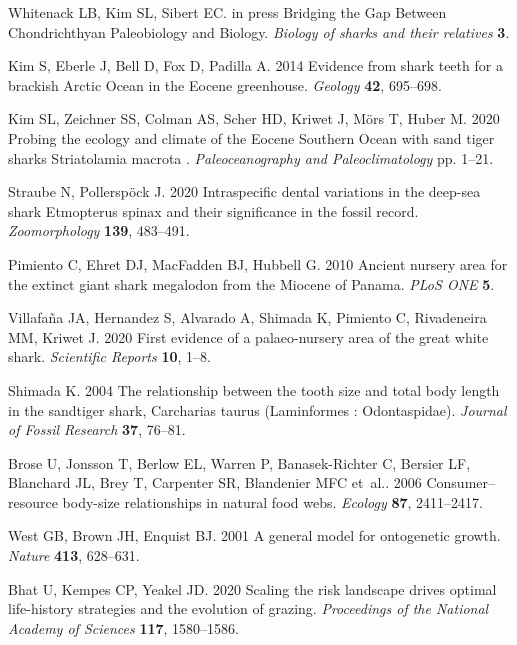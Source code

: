 \documentclass[]{rsos}%
\begin{document}
\begin{thebibliography}{99}

Whitenack LB, Kim SL, Sibert EC. in press  Bridging the Gap Between
  Chondrichthyan Paleobiology and Biology. {\em Biology of sharks and their
  relatives} \textbf{3}.

Kim S, Eberle J, Bell D, Fox D, Padilla A. 2014  {Evidence from shark teeth for
  a brackish Arctic Ocean in the Eocene greenhouse}. {\em Geology} \textbf{42},
  695--698.

Kim SL, Zeichner SS, Colman AS, Scher HD, Kriwet J, M{\"{o}}rs T, Huber M. 2020
   { Probing the ecology and climate of the Eocene Southern Ocean with sand
  tiger sharks Striatolamia macrota }. {\em Paleoceanography and
  Paleoclimatology} pp. 1--21.

Straube N, Pollersp{\"o}ck J. 2020  Intraspecific dental variations in the
  deep-sea shark Etmopterus spinax and their significance in the fossil record.
  {\em Zoomorphology} \textbf{139}, 483--491.

Pimiento C, Ehret DJ, MacFadden BJ, Hubbell G. 2010  {Ancient nursery area for
  the extinct giant shark megalodon from the Miocene of Panama}. {\em PLoS ONE}
  \textbf{5}.

Villafa{\~{n}}a JA, Hernandez S, Alvarado A, Shimada K, Pimiento C, Rivadeneira
  MM, Kriwet J. 2020  {First evidence of a palaeo-nursery area of the great
  white shark}. {\em Scientific Reports} \textbf{10}, 1--8.

Shimada K. 2004  {The relationship between the tooth size and total body length
  in the sandtiger shark, Carcharias taurus (Laminformes : Odontaspidae)}. {\em
  Journal of Fossil Research} \textbf{37}, 76--81.

Brose U, Jonsson T, Berlow EL, Warren P, Banasek-Richter C, Bersier LF,
  Blanchard JL, Brey T, Carpenter SR, Blandenier MFC et~al.. 2006
  Consumer--resource body-size relationships in natural food webs. {\em
  Ecology} \textbf{87}, 2411--2417.

West GB, Brown JH, Enquist BJ. 2001  {A general model for ontogenetic growth}.
  {\em Nature} \textbf{413}, 628--631.

Bhat U, Kempes CP, Yeakel JD. 2020  Scaling the risk landscape drives optimal
  life-history strategies and the evolution of grazing. {\em Proceedings of the
  National Academy of Sciences} \textbf{117}, 1580--1586.


\end{thebibliography}
\end{document}
